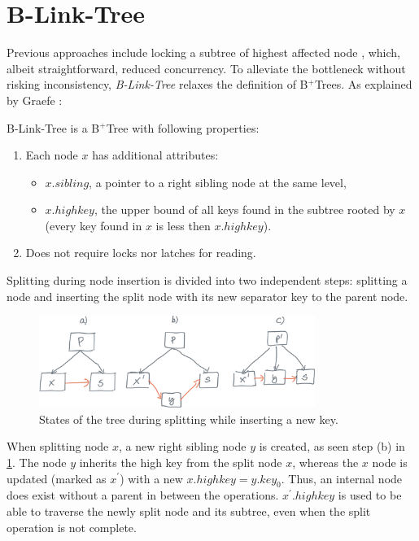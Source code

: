 \section{B-Link-Tree}\label{section:b-link-tree}

Previous approaches include locking a subtree of highest affected node \cite{samadi1976b}, which, albeit straightforward, reduced concurrency. To alleviate the bottleneck without risking inconsistency, \textit{B-Link-Tree} relaxes the definition of B$^+$Trees. As explained by Graefe \cite{goetz-tech}:

\begin{definition}
  B-Link-Tree is a B$^+$Tree with following properties:
  \begin{enumerate}
    \item Each node $x$ has additional attributes:
          \begin{itemize}
            \item $x.sibling$, a pointer to a right sibling node at the same level,
            \item $x.highkey$, the upper bound of all keys found in the subtree rooted by $x$ (every key found in $x$ is less then $x.highkey$).
          \end{itemize}
    \item Does not require locks nor latches for reading.
  \end{enumerate}
\end{definition}



Splitting during node insertion is divided into two independent steps: splitting a node and inserting the split node with its new separator key to the parent node.

\begin{figure}[H]
  \centering
  \includegraphics[width=0.8\textwidth ]{components/figure/b-link-insert}
  \caption{States of the tree during splitting while inserting a new key.}
  \label{figure:b-link-insert}
\end{figure}


When splitting node $x$, a new right sibling node $y$ is created, as seen step (b) in \cref{figure:b-link-insert}. The node $y$ inherits the high key from the split node $x$, whereas the $x$ node is updated (marked as $x^\prime$) with a new $x.highkey = y.key_0$. Thus, an internal node does exist without a parent in between the operations. $x^\prime.highkey$ is used to be able to traverse the newly split node and its subtree, even when the split operation is not complete.

